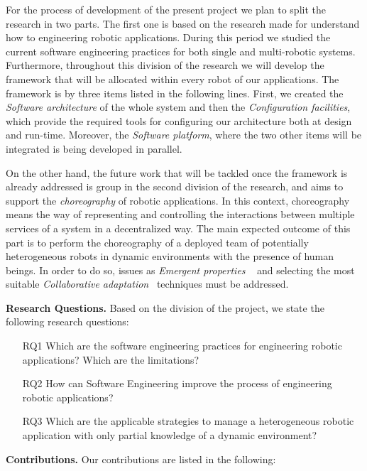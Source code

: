 For the process of development of the present project we plan to split the research in two parts.
The first one is based on the research made for understand how to engineering robotic applications.
During this period we studied the current software engineering practices for both single and multi-robotic systems.
Furthermore, throughout this division of the research we will develop the framework that will be allocated within every robot of our applications.
The framework is by three items listed in the following lines.
First, we created the \emph{Software architecture} of the whole system and then the \emph{Configuration facilities}, which provide the required tools for configuring our architecture both at design and run-time.
Moreover, the \emph{Software platform}, where the two other items will be integrated is being developed in parallel.

On the other hand, the future work that will be tackled once the framework is already addressed is group in the second division of the research, and aims to support the \emph{choreography} of robotic applications.
In this context, choreography means the way of representing and controlling the interactions between multiple services of a system in a decentralized way.
The main expected outcome of this part is to perform the choreography of a deployed team of potentially heterogeneous robots in dynamic environments with the presence of human beings.
In order to do so, issues as \emph{Emergent properties} ~\cite{DeAngelis2015,DeAngelis2016} and selecting the most suitable \emph{Collaborative adaptation}~\cite{Yan2013} techniques must be addressed.

\textbf{Research Questions.} 
Based on the division of the project, we state the following research questions:
\begin{itemize}
\item[RQ1] Which are the software engineering practices for engineering robotic applications? Which are the limitations?
\item[RQ2] How can Software Engineering improve the process of engineering robotic applications?
\item[RQ3] Which are the applicable strategies to manage a heterogeneous robotic application with only partial knowledge of a dynamic environment?
\end{itemize}

\textbf{Contributions.} 
Our contributions are listed in the following:

